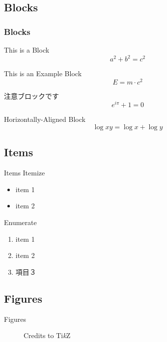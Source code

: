 \documentclass[compress]{beamer}
\begin{document}
\subsection{Blocks}

\begin{frame}
	\frametitle{Blocks}
	\begin{block}{This is a Block}
		\[
			a^2 + b^2 = c^2
		\]
	\end{block}
	\begin{exampleblock}{This is an Example Block}
		\[
			E = m \cdot c^{2}
		\]
	\end{exampleblock}
	\begin{alertblock}{注意ブロックです}
		\[
			e^{i\pi} + 1 = 0
		\]
	\end{alertblock}

	\centering
	\begin{minipage}{1.0\linewidth}
		\begin{block}{Horizontally-Aligned Block}
			\[
				\log xy = \log x + \log y
			\]
		\end{block}
	\end{minipage}
\end{frame}

\subsection{Items}

\begin{frame}{Items}
	Itemize
	\begin{itemize}
		\item item 1
		\item item 2
	\end{itemize}

	\bigskip

	Enumerate
	\begin{enumerate}
		\item item 1
		\item item 2
		\item 項目３
	\end{enumerate}
\end{frame}

\subsection{Figures}

\begin{frame}{Figures}
	\begin{figure}
		\centering
		\caption{Credits to Ti\textit{k}Z}
	\end{figure}
\end{frame}
\end{document}
